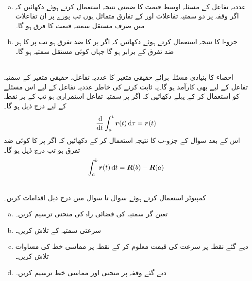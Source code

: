 \\
\begin{enumerate}[a.]
\item
عددیہ تفاعل کے مسئلہ اوسط قیمت کا ضمنی نتیجہ   استعمال کرتے ہوئے  دکھائیں کہ اگر  وقفہ  پر دو سمتیہ  تفاعلات   اور   کے تفارق  متماثل  ہوں  تب پورے   پر ان تفاعلات  میں صرف  مستقل  سمتیہ قیمت کا فرق ہو گا۔
\item
جزو-ا کا نتیجہ استعمال کرتے ہوئے  دکھائیں کہ اگر پر  کا ضد تفرق   ہو تب  پر  کا ہر ضد تفرق  کے برابر ہو گا جہاں  کوئی مستقل سمتیہ ہو گا۔
\end{enumerate}
\\
احصاء کا بنیادی مسئلہ برائے  حقیقی  متغیر کا عددیہ تفاعل، حقیقی متغیر کے سمتیہ  تفاعل کے لیے بھی کارآمد ہو گا۔یہ ثابت کرنے کی خاطر عددیہ تفاعل کے لیے اس مسئلے  کو استعمال کر کے پہلے دکھائیں کہ اگر   پر سمتیہ  تفاعل  استمراری ہو تب   کے ہر نقطہ  کے لیے  درج ذیل ہو گا۔
\begin{align*}
\frac{\dif}{\dif t}\int_a^t\kvec{r}(t)\dif \tau=\kvec{r}(t)
\end{align*}    
اس کے بعد  سوال  کے جزو-ب  کا نتیجہ استعمال کر کے  دکھائیں کہ اگر  پر  کا   کوئی  ضد تفرق   ہو تب درج ذیل ہو گا۔
\begin{align*}
\int_a^b\kvec{r}(t)\dif t=\kvec{R}(b)-\kvec{R}(a)
\end{align*}

\\
کمپیوٹر استعمال کرتے ہوئے سوال  تا سوال  میں درج ذیل اقدامات  کریں۔
\begin{enumerate}[a.]
\item
تعین گر سمتیہ   کی  فضائی راہ کی منحنی  ترسیم کریں۔
\item
سرعتی سمتیہ   کے  تلاش کریں۔
\item
دیے گئے نقطہ  پر سرعت  کی قیمت معلوم کر کے نقطہ  پر مماسی خط کی مساوات تلاش کریں۔
\item
دیے گئے وقفہ پر منحنی اور مماسی  خط   ترسیم کریں۔ 
\end{enumerate}

